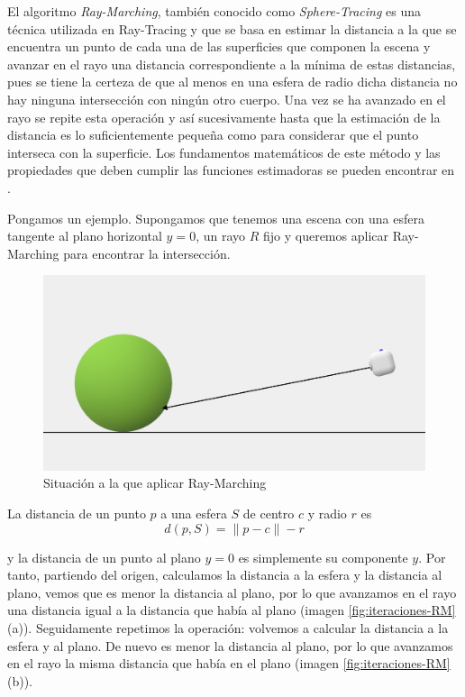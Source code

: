 El algoritmo \textit{Ray-Marching}, también conocido como \textit{Sphere-Tracing} es una técnica utilizada en Ray-Tracing y que se basa en estimar la distancia a la que se encuentra un punto de cada una de las superficies que componen la escena y avanzar en el rayo una distancia correspondiente a la mínima de estas distancias, pues se tiene la certeza de que al menos en una esfera de radio dicha distancia no hay ninguna intersección con ningún otro cuerpo. Una vez se ha avanzado en el rayo se repite esta operación y así sucesivamente hasta que la estimación de la distancia es lo suficientemente pequeña como para considerar que el punto interseca con la superficie. Los fundamentos matemáticos de este método y las propiedades que deben cumplir las funciones estimadoras se pueden encontrar en \cite{Hart-1995}. 

Pongamos un ejemplo. Supongamos que tenemos una escena con una esfera tangente al plano horizontal $y=0$, un rayo $R$ fijo y queremos aplicar Ray-Marching para encontrar la intersección.

\begin{figure} [ht]
    \centering
    \includegraphics[scale = 0.2]{img/C8/situacion-inicial.png}
    \caption{Situación a la que aplicar Ray-Marching}
    \label{fig:RM-inicial}
\end{figure}

La distancia de un punto $p$ a una esfera $S$ de centro $c$ y radio $r$ es 
\begin{equation}
    \label{eq:distancia-punto-esfera}
    d(p,S) = \|p-c\| - r 
\end{equation}

y la distancia de un punto al plano $y=0$ es simplemente su componente $y$. Por tanto, partiendo del origen, calculamos la distancia a la esfera y la distancia al plano, vemos que es menor la distancia al plano, por lo que avanzamos en el rayo una distancia igual a la distancia que había al plano (imagen \ref{fig:iteraciones-RM} (a)). Seguidamente repetimos la operación: volvemos a calcular la distancia a la esfera y al plano. De nuevo es menor la distancia al plano, por lo que avanzamos en el rayo la misma distancia que había en el plano (imagen \ref{fig:iteraciones-RM} (b)).

